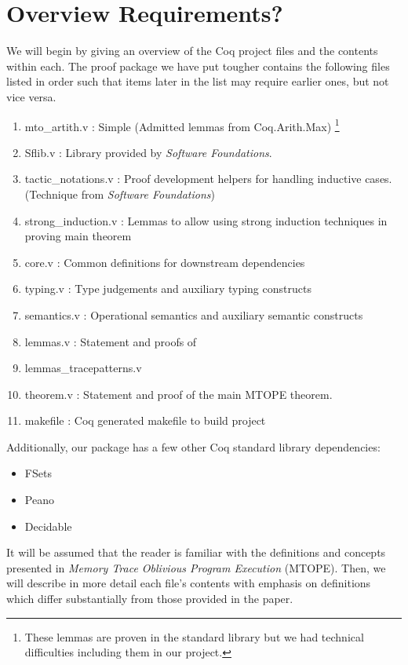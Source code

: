 \documentclass[10pt,  onecolumn]{article}
\begin{document}
\section {Overview Requirements?}
\label{sec:requirements}

We will begin by giving an overview of the Coq project files and the contents within each.
The proof package we have put tougher contains the following files listed in order such that items later in the list may require earlier ones, but not vice versa.

\begin{enumerate}
\item mto_artith.v : Simple (Admitted lemmas from Coq.Arith.Max) \footnote{These lemmas are proven in the standard library but we had technical difficulties including them in our project.}
\item Sflib.v : Library provided by \emph{Software Foundations}. \cite{sf}
\item tactic\_notations.v : Proof development helpers for handling inductive cases. (Technique from \emph{Software Foundations})\cite{sf}
\item strong\_induction.v : Lemmas to allow using strong induction techniques in proving main theorem \cite{strongind}
\item core.v : Common definitions for downstream dependencies
\item typing.v : Type judgements and auxiliary typing constructs
\item semantics.v : Operational semantics and auxiliary semantic constructs
\item lemmas.v : Statement and proofs of 
\item lemmas\_tracepatterns.v
\item theorem.v : Statement and proof of the main MTOPE theorem.
\item makefile : Coq generated makefile to build project
\end{enumerate}

Additionally, our package has a few other Coq standard library dependencies:
\begin{itemize}
\item FSets
\item	Peano
\item Decidable
\end{itemize}


It will be assumed that the reader is familiar with the definitions and concepts presented in \emph{Memory Trace Oblivious Program Execution} (MTOPE).
Then, we will describe in more detail each file's contents with emphasis on definitions which differ substantially from those provided in the paper.
\end{document}
